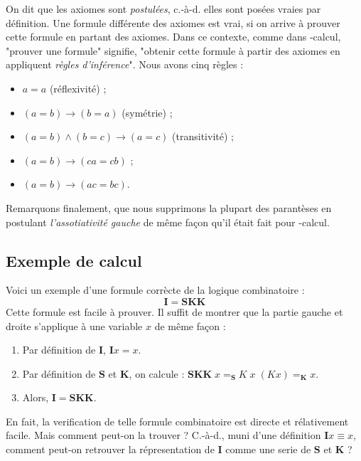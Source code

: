 On dit que les axiomes sont \emph{postulées}, c.-à-d. elles sont posées vraies par définition. Une formule différente des axiomes est vrai, si on arrive à prouver cette formule en partant des axiomes. Dans ce contexte, comme dans \lam -calcul, "prouver une formule" signifie, "obtenir cette formule à partir des axiomes en appliquent \emph{règles d'inférence}". Nous avons cinq règles :
\begin{itemize}
	\item $a = a$ (réflexivité) ;
	\item $(a = b) \to (b = a)$ (symétrie) ;
	\item $(a = b) \land (b = c) \to (a = c)$ (transitivité) ;
	\item $(a = b) \to (ca = cb)$ ;
	\item $(a = b) \to (ac = bc)$.
\end{itemize}

Remarquons finalement, que nous supprimons la plupart des parantèses en postulant \emph{l'assotiativité gauche} de même façon qu'il était fait pour \lam -calcul.

\subsection*{Exemple de calcul}

Voici un exemple d'une formule corrècte de la logique combinatoire :
\[\mathbf{I} = \mathbf{SKK}\]
Cette formule est facile à prouver. Il suffit de montrer que la partie gauche et droite s'applique à une variable $x$ de même façon :
\begin{enumerate}
	\item Par définition de $\mathbf{I}$, $\mathbf{I}x = x$.
	\item Par définition de $\mathbf{S}$ et $\mathbf{K}$, on calcule : $\mathbf{SKK} \; x =_\mathbf{S} K \; x \; (K x) =_\mathbf{K} x$.
	\item Alors, $\mathbf{I} = \mathbf{SKK}$.
\end{enumerate}

En fait, la verification de telle formule combinatoire est directe et rélativement facile. Mais comment peut-on la trouver ? C.-à-d., muni d'une définition $\mathbf{I} x \equiv x$, comment peut-on retrouver la répresentation de $\mathbf{I}$ comme une serie de $\mathbf{S}$ et $\mathbf{K}$ ?

